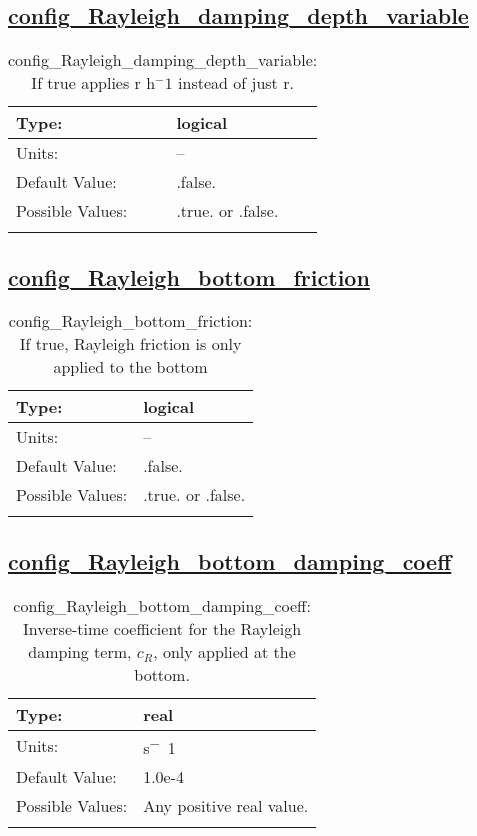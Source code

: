 \subsection[config\_Rayleigh\_damping\_depth\_variable]{\hyperref[sec:nm_tab_Rayleigh_damping]{config\_Rayleigh\_damping\_depth\_variable}}
\label{subsec:nm_sec_config_Rayleigh_damping_depth_variable}
\begin{center}
\begin{longtable}{| p{2.0in} || p{4.0in} |}
    \hline
    Type: & logical \\
    \hline
    Units: & -- \\
    \hline
    Default Value: & .false. \\
    \hline
    Possible Values: & .true. or .false. \\
    \hline
    \caption{config\_Rayleigh\_damping\_depth\_variable: If true applies r h$^-1$ instead of just r.}
\end{longtable}
\end{center}
\subsection[config\_Rayleigh\_bottom\_friction]{\hyperref[sec:nm_tab_Rayleigh_damping]{config\_Rayleigh\_bottom\_friction}}
\label{subsec:nm_sec_config_Rayleigh_bottom_friction}
\begin{center}
\begin{longtable}{| p{2.0in} || p{4.0in} |}
    \hline
    Type: & logical \\
    \hline
    Units: & -- \\
    \hline
    Default Value: & .false. \\
    \hline
    Possible Values: & .true. or .false. \\
    \hline
    \caption{config\_Rayleigh\_bottom\_friction: If true, Rayleigh friction is only applied to the bottom}
\end{longtable}
\end{center}
\subsection[config\_Rayleigh\_bottom\_damping\_coeff]{\hyperref[sec:nm_tab_Rayleigh_damping]{config\_Rayleigh\_bottom\_damping\_coeff}}
\label{subsec:nm_sec_config_Rayleigh_bottom_damping_coeff}
\begin{center}
\begin{longtable}{| p{2.0in} || p{4.0in} |}
    \hline
    Type: & real \\
    \hline
    Units: & \si{s^-1} \\
    \hline
    Default Value: & 1.0e-4 \\
    \hline
    Possible Values: & Any positive real value. \\
    \hline
    \caption{config\_Rayleigh\_bottom\_damping\_coeff: Inverse-time coefficient for the Rayleigh damping term, $c_R$, only applied at the bottom.}
\end{longtable}
\end{center}
